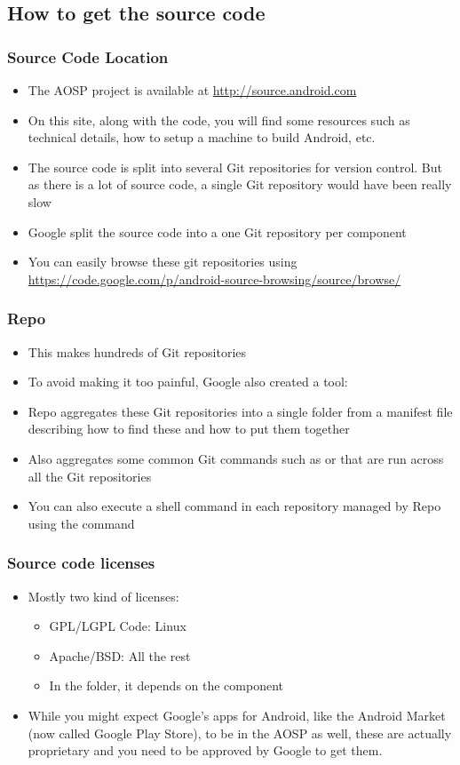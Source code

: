 \subsection{How to get the source code}
\begin{frame}
  \frametitle{Source Code Location}
  \begin{itemize}
  \item The AOSP project is available at
    \url{http://source.android.com}
  \item On this site, along with the code, you will find some resources
    such as technical details, how to setup a machine to build
    Android, etc.
  \item The source code is split into several Git repositories for
    version control. But as there is a lot of source code, a single
    Git repository would have been really slow
  \item Google split the source code into a one Git repository per
    component
  \item You can easily browse these git repositories using
    \url{https://code.google.com/p/android-source-browsing/source/browse/}
  \end{itemize}
\end{frame}

\begin{frame}
  \frametitle{Repo}
  \begin{itemize}
  \item This makes hundreds of Git repositories\!
  \item To avoid making it too painful, Google also created a tool:
  \item Repo aggregates these Git repositories into a single folder
    from a manifest file describing how to find these and how to put
    them together
  \item Also aggregates some common Git commands such as 
    or  that are run across all the Git repositories
  \item You can also execute a shell command in each repository
    managed by Repo using the  command
  \end{itemize}
\end{frame}

\begin{frame}
  \frametitle{Source code licenses}
  \begin{itemize}
  \item Mostly two kind of licenses:
    \begin{itemize}
    \item GPL/LGPL Code: Linux
    \item Apache/BSD: All the rest
    \item In the  folder, it depends on the component
    \end{itemize}
  \item While you might expect Google's apps for Android, like the
    Android Market (now called Google Play Store), to be in the AOSP
    as well, these are actually proprietary and you need to be
    approved by Google to get them.
  \end{itemize}
\end{frame}
